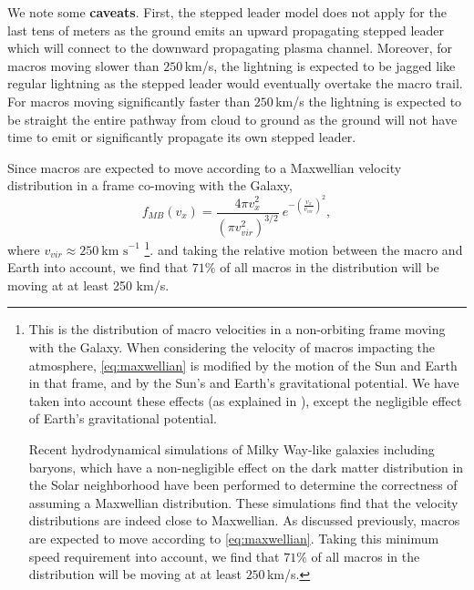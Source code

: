 \documentclass[%
 reprint,
 amsmath,amssymb,
 aps,
]{revtex4-2}
\newcommand{\vtwo}[1]{{\color{red} #1}}
\begin{document}
        We note some \vtwo{\textbf{caveats}}. First, the stepped leader model does not apply for the last tens of meters as the ground emits an upward propagating stepped leader which will connect to the downward propagating plasma channel. Moreover, for macros moving slower than $250\,$km/s, the lightning is expected to be jagged like regular lightning as the stepped leader would eventually overtake the macro trail. For macros moving significantly faster than $250\,$km/s the lightning is expected to be straight the entire pathway from cloud to ground as the ground will not have time to emit or significantly propagate its own stepped leader. 

        Since macros are expected to move according to a Maxwellian velocity distribution in a frame co-moving with the Galaxy,
        \begin{equation}\label{eq:maxwellian}
        	f_{MB}(v_x) = 
        		\frac{4\pi v_x^2}
        		{\left({\pi v_{vir}^2}\right)^{3/2}}~
        		e^{-\left(\frac{v_x}{v_{vir}}\right)^2}, 
        \end{equation}
        where $v_{vir} \approx 250~ \text{km s}^{-1}$ \footnote{
        	This is the distribution of macro velocities in a non-orbiting frame moving with the Galaxy. When considering the velocity of macros impacting the atmosphere, \eqref{eq:maxwellian} is modified by the motion of the Sun and Earth in that frame, and by the Sun's and Earth's gravitational potential. We have taken into account these effects (as explained in \vtwo{\citet{Freese2013}}), except the negligible effect of Earth's gravitational potential.

        	Recent hydrodynamical simulations of Milky Way-like galaxies including baryons, which have a non-negligible effect on the dark matter distribution in the Solar \vtwo{neighborhood} \vtwo{\citep{Tanabashi2018}} have been performed to determine the correctness of assuming a Maxwellian distribution. These simulations find that the velocity distributions are indeed close to Maxwellian. As discussed previously, macros are expected to move according to \eqref{eq:maxwellian}. Taking this minimum speed requirement into account, we find that $71\%$ of all macros in the distribution will be moving at at least $250\,$km/s. 
    	}.
        and taking the relative motion between the macro and Earth into account, we find that $71\%$ of all macros in the distribution will be moving at at least 250 km/s.
\end{document}
